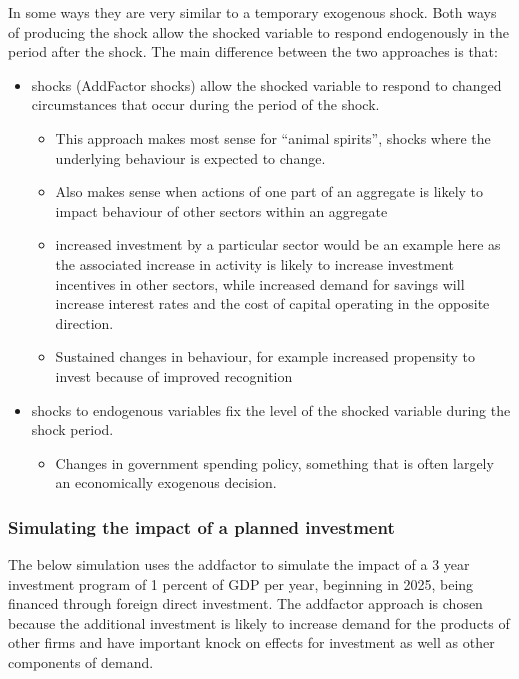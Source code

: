 \documentclass[letterpaper,10pt,english]{jupyterBook}
\begin{document}
\sphinxAtStartPar
In some ways they are very similar to a temporary exogenous shock. Both ways of producing the shock allow the shocked variable to respond endogenously in the period after the shock.  The main difference between the two approaches is that:
\begin{itemize}
\item {} 
\sphinxAtStartPar
{} shocks (Add\sphinxhyphen{}Factor shocks) allow the shocked variable to respond to changed circumstances that occur during the period of the shock.
\begin{itemize}
\item {} 
\sphinxAtStartPar
This approach makes most sense for “animal spirits”, shocks where the underlying behaviour is expected to change.

\item {} 
\sphinxAtStartPar
Also makes sense when actions of one part of an aggregate is likely to impact behaviour of other sectors within an aggregate

\item {} 
\sphinxAtStartPar
increased investment by a particular sector would be an example here as the associated increase in activity is likely to increase investment incentives in other sectors, while increased demand for savings will increase interest rates and the cost of capital operating in the opposite direction.

\item {} 
\sphinxAtStartPar
Sustained changes in behaviour, for example increased propensity to invest because of improved recognition

\end{itemize}

\item {} 
\sphinxAtStartPar
{} shocks to endogenous variables fix the level of the shocked variable during the shock period.
\begin{itemize}
\item {} 
\sphinxAtStartPar
Changes in government spending policy, something that is often largely an economically exogenous decision.

\end{itemize}

\end{itemize}


\subsubsection{Simulating the impact of a planned investment}
\label{\detokenize{content/06_WBModels/ScenarioAnalysis:simulating-the-impact-of-a-planned-investment}}
\sphinxAtStartPar
The below simulation uses the add\sphinxhyphen{}factor to simulate the impact of a 3 year investment  program of 1 percent of GDP per year, beginning in 2025, being financed through foreign direct investment.  The add\sphinxhyphen{}factor approach is chosen because the additional investment is likely to increase demand for the products of other firms and have important knock on effects for investment as well as other components of demand.
\end{document}
